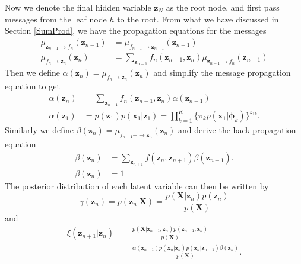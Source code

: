 \documentclass[a4paper]{report}
\renewcommand{\bf}{\mathbf}
\newcommand{\bs}{\boldsymbol}
\begin{document}
Now we denote the final hidden variable $\bf{z}_N$ as the root node, and first pass messages from the leaf node $h$ to the root. From what we have discussed in Section \ref{SumProd}, we have the propagation equations for the messages
\begin{align}
	\mu_{\bf{z}_{n-1}\rightarrow f_n}(\bf{z}_{n-1}) &= \mu_{f_{n-1}\rightarrow \bf{z}_{n-1}}(\bf{z}_{n-1}) \\
	\mu_{f_n \rightarrow \bf{z}_{n}}(\bf{z}_n) &= \sum_{\bf{z}_{n-1}}f_n (\bf{z}_{n-1},\bf{z}_n)\mu_{\bf{z}_{n-1}\rightarrow f_n}(\bf{z}_{n-1})
\end{align}
Then we define $\alpha(\bf{z}_n) = \mu_{f_n \rightarrow \bf{z}_n}(\bf{z}_n)$ and simplify the message propagation equation to get
\begin{align}
	\alpha(\bf{z}_n) &= \sum_{\bf{z}_{n-1}} f_n (\bf{z}_{n-1},\bf{z}_n) \alpha(\bf{z}_{n-1})\\
	\alpha(\bf{z}_1) &= p(\bf{z}_1)p(\bf{x}_1|\bf{z}_1)=\prod_{k=1}^K \{ \pi_k p(\bf{x}_1|\bs{\phi}_k) \}^{z_{1k}}.
\end{align}
Similarly we define $\beta(\bf{z}_n) = \mu_{f_{n+1}-\rightarrow\bf{z}_n}(\bf{z}_n)$ and derive the back propagation equation
\begin{align}
	\beta(\bf{z}_n) &= \sum_{\bf{z}_{n+1}} f(\bf{z}_n,\bf{z}_{n+1}) \beta(\bf{z}_{n+1}). \\
	\beta(\bf{z}_n) &= 1
\end{align}
The posterior distribution of each latent variable can then be written by
\begin{equation}
	\gamma(\bf{z}_n) = p(\bf{z}_n|\bf{X}) = \frac{p(\bf{X}|\bf{z}_n)p(\bf{z}_n)}{p(\bf{X})}
\end{equation}
and
\begin{align}
	\xi(\bf{z}_{n+1}|\bf{z}_n) &= \frac{p(\bf{X}|\bf{z}_{n-1},\bf{z}_n)p(\bf{z}_{n-1},\bf{z}_n)}{p(\bf{X})} \\
	&= \frac{\alpha(\bf{z}_{n-1})p(\bf{x}_n|\bf{z}_n)p(\bf{z}_n|\bf{z}_{n-1})\beta(\bf{z}_n)}{p(\bf{X})}.
\end{align}
\end{document}
